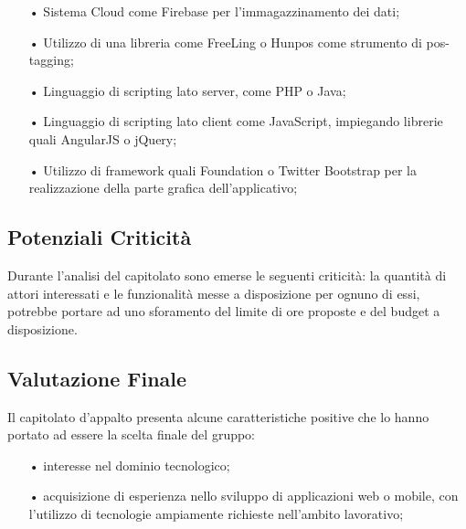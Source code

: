 \begin{itemize}
\item[•] Sistema Cloud come Firebase per l'immagazzinamento dei dati;

\item[•] Utilizzo di una libreria come FreeLing o Hunpos come strumento di pos-tagging;

\item[•] Linguaggio di scripting lato server, come PHP o Java;

\item[•] Linguaggio di scripting lato client come JavaScript, impiegando librerie quali AngularJS o jQuery;

\item[•] Utilizzo di framework quali Foundation o Twitter Bootstrap per la realizzazione della parte grafica dell’applicativo;

\end{itemize}

\subsection{Potenziali Criticità}
Durante l’analisi del capitolato sono emerse le seguenti criticità:
la quantità di attori interessati e le funzionalità messe a disposizione per ognuno di essi, potrebbe portare ad uno sforamento del limite di ore proposte e del budget a disposizione.

\subsection{Valutazione Finale}
Il capitolato d’appalto presenta alcune caratteristiche positive che lo hanno portato ad essere
la scelta finale del gruppo:
\begin{itemize}
\item[•] interesse nel dominio tecnologico;
\item[•] acquisizione di esperienza nello sviluppo di applicazioni web o mobile, con l’utilizzo di tecnologie
ampiamente richieste nell’ambito lavorativo;


\end{itemize}

